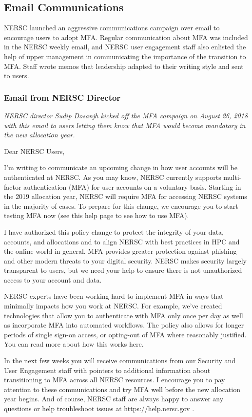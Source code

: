 \documentclass[sigconf,review]{acmart}
\begin{document}
\subsection{Email Communications}
\label{email}

NERSC launched an aggressive communications campaign over email to encourage
users to adopt MFA. Regular communication about MFA was included in the NERSC
weekly email, and NERSC user engagement staff also enlisted the help of upper
management in communicating the importance of the transition to MFA. Staff
wrote memos that leadership adapted to their writing style and sent to users.

\subsubsection{Email from NERSC Director}
{\em NERSC director Sudip Dosanjh kicked off the MFA campaign on
August 26, 2018 with this email to users letting them know
that MFA would become mandatory in the new allocation year.}

Dear NERSC Users, 

I’m writing to communicate an upcoming change in how user accounts will be authenticated at NERSC. As you may know, NERSC currently supports multi-factor authentication (MFA) for user accounts on a voluntary basis. Starting in the 2019 allocation year, NERSC will require MFA for accessing NERSC systems in the majority of cases.  To prepare for this change, we encourage you to start testing MFA now (see this help page to see how to use MFA).

I have authorized this policy change to protect the integrity of your data, accounts, and allocations and to align NERSC with best practices in HPC and the online world in general.  MFA provides greater protection against phishing and other modern threats to your digital security.  NERSC makes security largely transparent to users, but we need your help to ensure there is not unauthorized access to your account and data.

NERSC experts have been working hard to implement MFA in ways that minimally impacts how you work at NERSC. For example, we've created technologies that allow you to authenticate with MFA only once per day as well as incorporate  MFA into automated workflows.  The policy also allows for longer periods of single sign-on access, or opting-out of MFA where reasonably justified. You can read more about how this works here.

In the next few weeks you will receive communications from our Security and User Engagement staff with pointers to additional information about transitioning to MFA across all NERSC resources. I encourage you to pay attention to these communications and try MFA well before the new allocation year begins. And of course, NERSC staff are always happy to answer any questions or help troubleshoot issues at https://help.nersc.gov .
\end{document}
